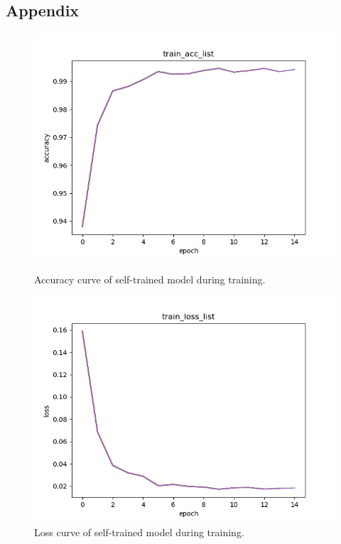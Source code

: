 \documentclass{article}
\begin{document}
\subsection{Appendix}

\begin{figure}[!htb]
  \begin{minipage}[t]{0.45\textwidth}
    \centering
    \includegraphics[width=\linewidth]{./results_train/train_acc_list.png}
    \caption{Accuracy curve of self-trained model during training.}
    \label{fig:Appendix1}
  \end{minipage}
  \hfill
  \begin{minipage}[t]{0.45\textwidth}
    \centering
    \includegraphics[width=\linewidth]{./results_train/train_loss_list.png}
    \caption{Loss curve of self-trained model during training.}
    \label{fig:Appendix2}
  \end{minipage}
\end{figure}
\end{document}
